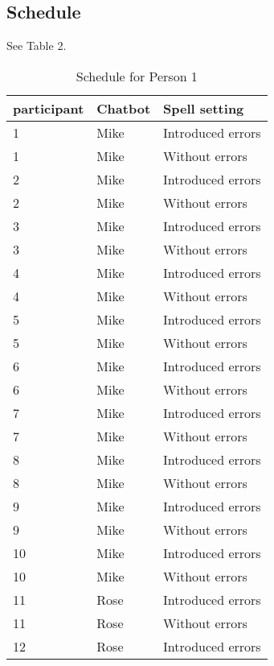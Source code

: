 \subsection{Schedule}
See Table 2.
\begin{table}[!ht]
   \begin{center}
      \caption{Schedule for Person 1}
      \label{tabscheduleperson1}
      \vskip 0.12in
      \begin{tabular}[center]{| l | l | l |}
         \hline
         participant & Chatbot & Spell setting \\
         \hline \hline
         1 & Mike & Introduced errors \\
         1 & Mike & Without errors \\
         \hline
         2 & Mike & Introduced errors \\
         2 & Mike & Without errors \\
         \hline
         3 & Mike & Introduced errors \\
         3 & Mike & Without errors \\
         \hline
         4 & Mike & Introduced errors \\
         4 & Mike & Without errors \\
         \hline
         5 & Mike & Introduced errors \\
         5 & Mike & Without errors \\
         \hline
         6 & Mike & Introduced errors \\
         6 & Mike & Without errors \\
         \hline
         7 & Mike & Introduced errors \\
         7 & Mike & Without errors \\
         \hline
         8 & Mike & Introduced errors \\
         8 & Mike & Without errors \\
         \hline
         9 & Mike & Introduced errors \\
         9 & Mike & Without errors \\
         \hline
         10 & Mike & Introduced errors \\
         10 & Mike & Without errors \\
         \hline \hline
         11 & Rose & Introduced errors \\
         11 & Rose & Without errors \\
         \hline
         12 & Rose & Introduced errors \\

\end{tabular}
\end{center}
\end{table}
